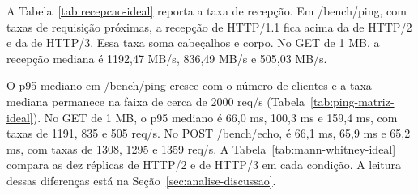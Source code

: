 A Tabela~\ref{tab:recepcao-ideal} reporta a taxa de recepção. Em /bench/ping, com taxas de requisição próximas, a recepção de HTTP/1.1 fica acima da de HTTP/2 e da de HTTP/3. Essa taxa soma cabeçalhos e corpo. No GET de 1 MB, a recepção mediana é 1192,47 MB/s, 836,49 MB/s e 505,03 MB/s.

O p95 mediano em /bench/ping cresce com o número de clientes e a taxa mediana permanece na faixa de cerca de 2000 req/s (Tabela~\ref{tab:ping-matriz-ideal}). No GET de 1 MB, o p95 mediano é 66,0 ms, 100,3 ms e 159,4 ms, com taxas de 1191, 835 e 505 req/s. No POST /bench/echo, é 66,1 ms, 65,9 ms e 65,2 ms, com taxas de 1308, 1295 e 1359 req/s. A Tabela~\ref{tab:mann-whitney-ideal} compara as dez réplicas de HTTP/2 e de HTTP/3 em cada condição. A leitura dessas diferenças está na Seção~\ref{sec:analise-discussao}.


